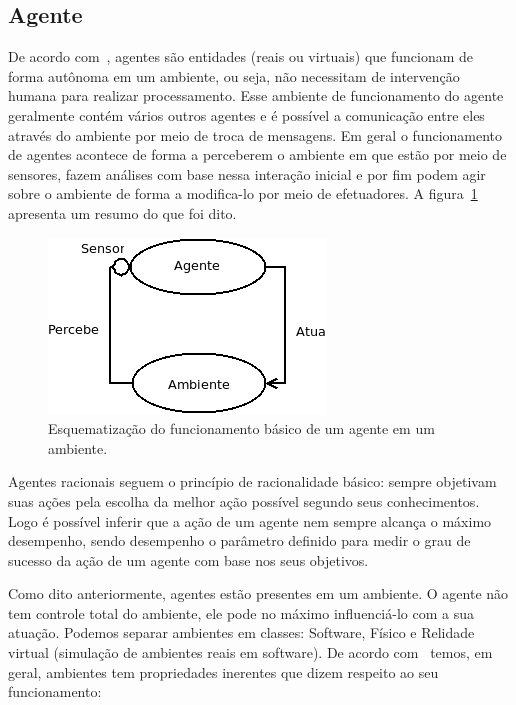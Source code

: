 \subsection{Agente}

De acordo com~\cite{novig95}, agentes são entidades (reais ou virtuais) que funcionam de forma autônoma em um ambiente, ou seja, não necessitam de intervenção humana para realizar processamento. Esse ambiente de funcionamento do agente geralmente contém vários outros agentes e é possível a comunicação entre eles através do ambiente por meio de troca de mensagens. Em geral o funcionamento de agentes acontece de forma a perceberem o ambiente em que estão por meio de sensores, fazem análises com base nessa interação inicial e por fim podem agir sobre o ambiente de forma a modifica-lo por meio de efetuadores. A figura~\ref{fig:agente-basico} apresenta um resumo do que foi dito.

\begin{figure}
	\includegraphics[scale=0.75]{images/agente-basico.png}
	\caption{Esquematização do funcionamento básico de um agente em um ambiente.}
	\label{fig:agente-basico}
\end{figure}

Agentes racionais seguem o princípio de racionalidade básico: sempre objetivam suas ações pela escolha da melhor ação possível segundo seus conhecimentos. Logo é possível inferir que a ação de um agente nem sempre alcança o máximo desempenho, sendo desempenho o parâmetro definido para medir o grau de sucesso da ação de um agente com base nos seus objetivos.

Como dito anteriormente, agentes estão presentes em um ambiente. O agente não tem controle total do ambiente, ele pode no máximo influenciá-lo com a sua atuação. Podemos separar ambientes em classes: Software, Físico e Relidade virtual (simulação de ambientes reais em software). De acordo com~\cite{wooldridge04} temos, em geral, ambientes tem propriedades inerentes que dizem respeito ao seu funcionamento:

